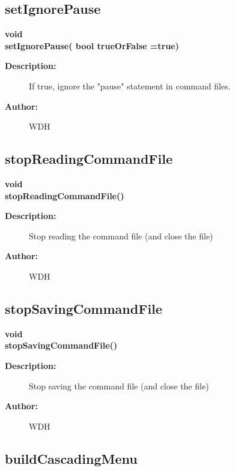\subsection{setIgnorePause}
 
\begin{flushleft} \textbf{%
void  \\ 
\settowidth{\GenericGraphicsInterfaceIncludeArgIndent}{setIgnorePause(}%
setIgnorePause( bool trueOrFalse  =true)
}\end{flushleft}
\begin{description}
\item[{\bf Description:}] 
 If true, ignore the "pause" statement in command files.
\item[{\bf Author:}]  WDH
\end{description}
\subsection{stopReadingCommandFile}
 
\begin{flushleft} \textbf{%
void  \\ 
\settowidth{\GenericGraphicsInterfaceIncludeArgIndent}{stopReadingCommandFile(}%
stopReadingCommandFile()
}\end{flushleft}
\begin{description}
\item[{\bf Description:}] 
 Stop reading the command file (and close the file)

\item[{\bf Author:}]  WDH
\end{description}
\subsection{stopSavingCommandFile}
 
\begin{flushleft} \textbf{%
void  \\ 
\settowidth{\GenericGraphicsInterfaceIncludeArgIndent}{stopSavingCommandFile(}%
stopSavingCommandFile()
}\end{flushleft}
\begin{description}
\item[{\bf Description:}] 
 Stop saving the command file (and close the file)

\item[{\bf Author:}]  WDH
\end{description}
\subsection{buildCascadingMenu}
 
